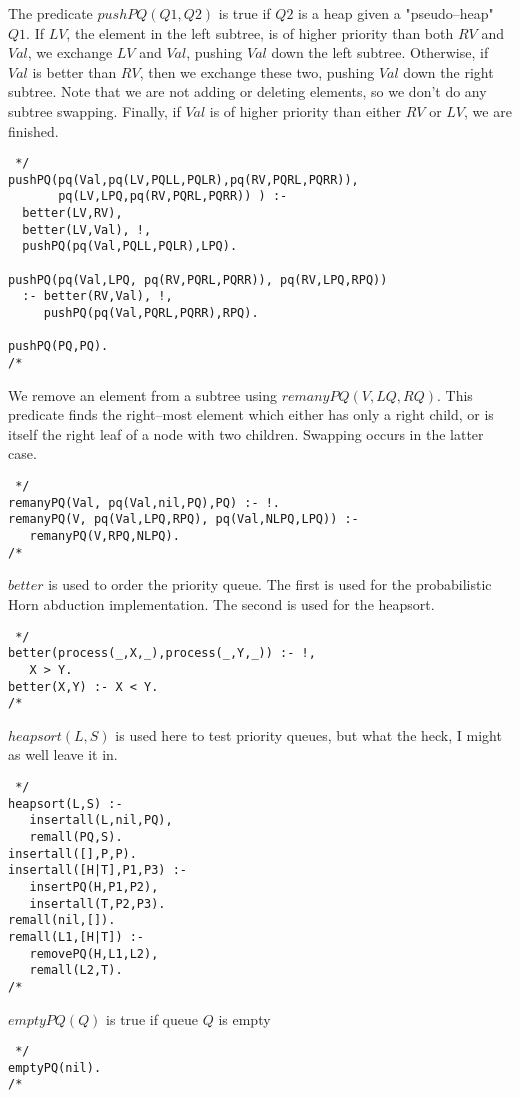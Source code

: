 The predicate $pushPQ(Q1,Q2)$ is true if $Q2$ is a heap given a
"pseudo--heap" $Q1$.  If $LV$, the element in the left subtree, is of higher
priority than both $RV$ and $Val$, we exchange $LV$ and $Val$, pushing
$Val$ down the left subtree.  Otherwise, if  $Val$ is better than
$RV$, then we exchange these two, pushing $Val$ down the right
subtree.  Note that we are not adding or deleting elements, so we
don't do any subtree swapping.  Finally, if $Val$ is of higher
priority than either $RV$ or $LV$, we are finished.
\begin{verbatim} */
pushPQ(pq(Val,pq(LV,PQLL,PQLR),pq(RV,PQRL,PQRR)), 
       pq(LV,LPQ,pq(RV,PQRL,PQRR)) ) :-
  better(LV,RV),
  better(LV,Val), !,
  pushPQ(pq(Val,PQLL,PQLR),LPQ).

pushPQ(pq(Val,LPQ, pq(RV,PQRL,PQRR)), pq(RV,LPQ,RPQ))
  :- better(RV,Val), !,
     pushPQ(pq(Val,PQRL,PQRR),RPQ).

pushPQ(PQ,PQ).
/* \end{verbatim}

We remove an element
from a subtree using $remanyPQ(V,LQ,RQ)$.  This predicate
finds the right--most element which either has only a right child, 
or is itself the right leaf of a node with two children.  Swapping 
occurs in the latter case. 
\begin{verbatim} */
remanyPQ(Val, pq(Val,nil,PQ),PQ) :- !.
remanyPQ(V, pq(Val,LPQ,RPQ), pq(Val,NLPQ,LPQ)) :-
   remanyPQ(V,RPQ,NLPQ).
/* \end{verbatim}

$better$ is used to order the priority queue. The first is used for the
probabilistic Horn abduction implementation. The second is used for the
heapsort.

\begin{verbatim} */
better(process(_,X,_),process(_,Y,_)) :- !,
   X > Y.
better(X,Y) :- X < Y.
/* \end{verbatim}

$heapsort(L,S)$ is used here to test priority queues, but what the
heck, I might as well leave it in.
\begin{verbatim} */
heapsort(L,S) :-
   insertall(L,nil,PQ),
   remall(PQ,S).
insertall([],P,P).
insertall([H|T],P1,P3) :-
   insertPQ(H,P1,P2),
   insertall(T,P2,P3).
remall(nil,[]).
remall(L1,[H|T]) :-
   removePQ(H,L1,L2),
   remall(L2,T).
/* \end{verbatim}

$emptyPQ(Q)$ is true if queue $Q$ is empty
\begin{verbatim} */
emptyPQ(nil).
/* \end{verbatim}


